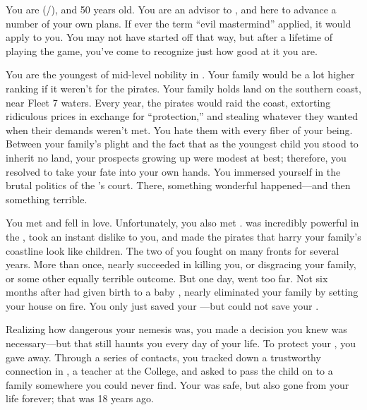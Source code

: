 \documentclass[char]{GL2020}
\begin{document}
\name{\cEvil{}}

You are \cEvil{\full} (\cEvil{\they}/\cEvil{\them}), and 50 years old. You are an advisor to \cQueen{\full}, and here to advance a number of your own plans. If ever the term ``evil mastermind'' applied, it would apply to you. You may not have started off that way, but after a lifetime of playing the game, you've come to recognize just how good at it you are.

You are the youngest \cEvil{\child} of mid-level nobility in \pFarm{}. Your family would be a lot higher ranking if it weren't for the pirates. Your family holds land on the southern coast, near Fleet 7 waters. Every year, the pirates would raid the coast, extorting ridiculous prices in exchange for ``protection,'' and stealing whatever they wanted when their demands weren't met. You hate them with every fiber of your being. Between your family's plight and the fact that as the youngest child you stood to inherit no land, your prospects growing up were modest at best; therefore, you resolved to take your fate into your own hands. You immersed yourself in the brutal politics of the \cQueen{\Majesty}'s court. There, something wonderful happened---and then something terrible.

You met \cPirateChildParent{} and fell in love. Unfortunately, you also met \cEvilNemesis{}. \cEvilNemesis{} was incredibly powerful in the \pFarm{}, took an instant dislike to you, and made the pirates that harry your family's coastline look like children. The two of you fought on many fronts for several years. More than once, \cEvilNemesis{\they} nearly succeeded in killing you, or disgracing your family, or some other equally terrible outcome. But one day, \cEvilNemesis{\they} went too far. Not six months after \cPirateChildParent{} had given birth to a baby \cPirateChild{\kid}, \cEvilNemesis{} nearly eliminated your family by setting your house on fire. You only just saved your \cPirateChild{\child}---but could not save your \cPirateChildParent{\spouse}.

Realizing how dangerous your nemesis was, you made a decision you knew was necessary---but that still haunts you every day of your life. To protect your \cPirateChild{\child}, you gave \cPirateChild{\them} away. Through a series of contacts, you tracked down a trustworthy connection in \cEthics{\full}, a teacher at the College, and asked \cEthics{\them} to pass the child on to a family somewhere you could never find. Your \cPirateChild{\child} was safe, but \cPirateChild{\they} \cPirateChild{\were} also gone from your life forever; that was 18 years ago. 
\end{document}
